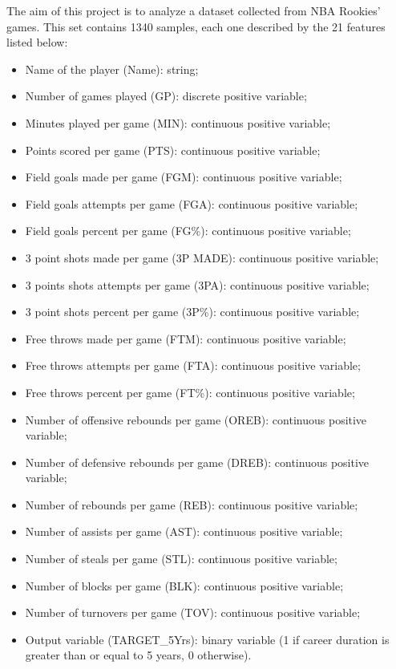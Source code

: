 The aim of this project is to analyze a dataset collected from NBA Rookies' games. This set contains 1340 samples, each one described by the 21 features listed below: 
\begin{itemize}
	\item Name of the player (Name): string;
	\item Number of games played (GP): discrete positive variable;
	\item Minutes played per game (MIN): continuous positive variable;
	\item Points scored per game (PTS): continuous positive variable;
	\item Field goals made per game (FGM): continuous positive variable;
	\item Field goals attempts per game (FGA): continuous positive  variable;
	\item Field goals percent per game (FG\%): continuous positive variable;
	\item 3 point shots made per game (3P MADE): continuous positive variable;
	\item 3 points shots attempts per game (3PA): continuous positive variable;
	\item 3 point shots percent per game (3P\%): continuous positive variable;
	\item Free throws made per game (FTM): continuous positive variable;
	\item Free throws attempts per game (FTA): continuous positive variable;
	\item Free throws percent per game (FT\%): continuous positive variable;
	\item Number of offensive rebounds per game (OREB): continuous positive variable;
	\item Number of defensive rebounds per game (DREB): continuous positive variable;
	\item Number of rebounds per game (REB): continuous positive variable;
	\item Number of assists per game (AST): continuous positive variable;
	\item Number of steals per game (STL): continuous positive variable;
	\item Number of blocks per game (BLK): continuous positive variable;
	\item Number of turnovers per game (TOV): continuous positive variable;
	\item Output variable (TARGET\_5Yrs): binary variable (1 if career duration is greater than or equal to 5 years, 0 otherwise).\\
\end{itemize} 

